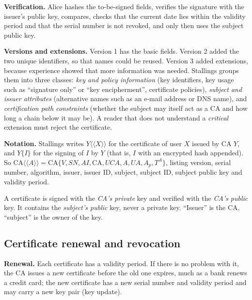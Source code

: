 \textbf{Verification.} Alice hashes the to-be-signed fields, verifies the signature with the issuer's public key, compares, checks that the current date lies within the validity period and that the serial number is not revoked, and only then uses the subject public key.

\textbf{Versions and extensions.} Version 1 has the basic fields. Version 2 added the two unique identifiers, so that names could be reused. Version 3 added extensions, because experience showed that more information was needed. Stallings groups them into three classes: \emph{key and policy information} (key identifiers, key usage such as ``signature only'' or ``key encipherment'', certificate policies), \emph{subject and issuer attributes} (alternative names such as an e-mail address or DNS name), and \emph{certification path constraints} (whether the subject may itself act as a CA and how long a chain below it may be). A reader that does not understand a \emph{critical} extension must reject the certificate.

\textbf{Notation.} Stallings writes $Y\langle\!\langle X \rangle\!\rangle$ for the certificate of user $X$ issued by CA $Y$, and $Y\{I\}$ for the signing of $I$ by $Y$ (that is, $I$ with an encrypted hash appended). So $\text{CA}\langle\!\langle A \rangle\!\rangle = \text{CA}\{V, SN, AI, \text{CA}, UCA, A, UA, A_p, T^A\}$, listing version, serial number, algorithm, issuer, issuer ID, subject, subject ID, subject public key and validity period.

\begin{trap}
A certificate is signed with the \emph{CA's private} key and verified with the \emph{CA's public} key. It contains the \emph{subject's public} key, never a private key. ``Issuer'' is the CA, ``subject'' is the owner of the key.
\end{trap}

\subsection{Certificate renewal and revocation \new}

\textbf{Renewal.} Each certificate has a validity period. If there is no problem with it, the CA issues a new certificate before the old one expires, much as a bank renews a credit card; the new certificate has a new serial number and validity period and may carry a new key pair (key update).

